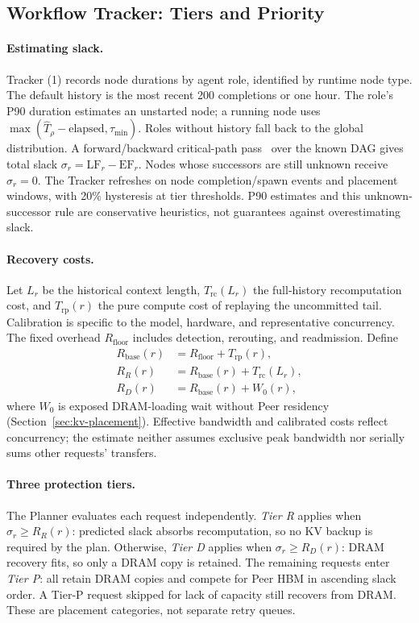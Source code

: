 \subsection{Workflow Tracker: Tiers and Priority}
\label{sec:workflow-protection}

\paragraph{Estimating slack.}
Tracker (1) records node durations by agent role, identified by runtime
node type. The default history is the most recent
200 completions or one hour. The role's P90 duration estimates an
unstarted node; a running node uses
$\max(\widehat T_\rho-\text{elapsed},\tau_{\min})$.
Roles without history fall back to the global distribution.
A forward/backward critical-path pass~\cite{kelley1959cpm} over the known
DAG gives total slack $\sigma_r=\mathrm{LF}_r-\mathrm{EF}_r$.
Nodes whose successors are still unknown receive $\sigma_r=0$.
The Tracker refreshes on node completion/spawn events and placement
windows, with 20\% hysteresis at tier thresholds. P90 estimates and this
unknown-successor rule are conservative heuristics, not guarantees
against overestimating slack.

\paragraph{Recovery costs.}
Let $L_r$ be the historical context length, $T_{\mathrm{rc}}(L_r)$ the
full-history recomputation cost, and $T_{\mathrm{rp}}(r)$ the pure
compute cost of replaying the uncommitted tail. Calibration is specific
to the model, hardware, and representative concurrency. The fixed
overhead $R_{\mathrm{floor}}$ includes detection, rerouting, and
readmission. Define
\begin{align}
 R_{\mathrm{base}}(r)&=R_{\mathrm{floor}}+T_{\mathrm{rp}}(r),\label{eq:recovery-base}\\
 R_R(r)&=R_{\mathrm{base}}(r)+T_{\mathrm{rc}}(L_r),\\
 R_D(r)&=R_{\mathrm{base}}(r)+W_0(r),
\end{align}
where $W_0$ is exposed DRAM-loading wait without Peer residency
(Section~\ref{sec:kv-placement}). Effective bandwidth and calibrated
costs reflect concurrency; the estimate neither assumes exclusive peak
bandwidth nor serially sums other requests' transfers.

\paragraph{Three protection tiers.}
The Planner evaluates each request independently.
\emph{Tier R} applies when $\sigma_r\ge R_R(r)$: predicted slack absorbs
recomputation, so no KV backup is required by the plan.
Otherwise, \emph{Tier D} applies when $\sigma_r\ge R_D(r)$: DRAM recovery
fits, so only a DRAM copy is retained. The remaining requests enter
\emph{Tier P}: all retain DRAM copies and compete for Peer HBM in ascending
slack order. A Tier-P request skipped for lack of capacity still recovers
from DRAM. These are placement categories, not separate retry queues.

